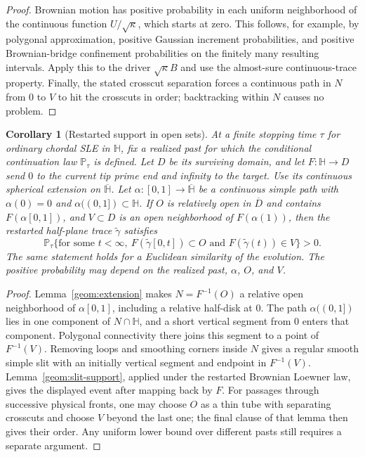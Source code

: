 \documentclass[11pt]{article}
\newtheorem{corollary}[theorem]{Corollary}
\theoremstyle{definition}
\theoremstyle{remark}
\numberwithin{equation}{section}
\begin{document}
\begin{proof}
Brownian motion has positive probability in each uniform
neighborhood of the continuous function $U/\sqrt\kappa$, which
starts at zero.  This follows, for example, by polygonal approximation,
positive Gaussian increment probabilities, and positive Brownian-bridge
confinement probabilities on the finitely many resulting intervals.
Apply this to the driver $\sqrt\kappa B$ and use the almost-sure
continuous-trace property.  Finally, the stated crosscut separation
forces a continuous path in $N$ from $0$ to $V$ to hit the crosscuts
in order; backtracking within $N$ causes no problem.
\end{proof}

\begin{corollary}[Restarted support in open sets]
\label{geom:restart-support}
At a finite stopping time $\tau$ for ordinary chordal SLE in
$\mathbb H$, fix a realized past for which the conditional continuation
law $\mathbb P_\tau$ is defined.  Let $D$ be its surviving domain, and
let $F:\mathbb H\to D$ send $0$ to the current tip prime end and infinity
to the target.  Use its continuous spherical extension on
$\overline{\mathbb H}$.  Let
$\alpha:[0,1]\to\overline{\mathbb H}$ be a continuous simple path with
$\alpha(0)=0$ and $\alpha((0,1])\subset\mathbb H$.
If $O$ is relatively open in $\overline D$ and contains
$F(\alpha[0,1])$, and $V\subset D$ is an open neighborhood of
$F(\alpha(1))$, then the restarted half-plane trace $\widetilde\gamma$
satisfies
\[
 \mathbb P_\tau\{\text{for some }t<\infty,
   \ F(\widetilde\gamma[0,t])\subset O
       \text{ and }F(\widetilde\gamma(t))\in V\}>0.
\]
The same statement holds for a Euclidean similarity of the evolution.
The positive probability may depend on the realized past, $\alpha$,
$O$, and $V$.
\end{corollary}

\begin{proof}
Lemma~\ref{geom:extension} makes $N=F^{-1}(O)$ a relative open
neighborhood of $\alpha[0,1]$, including a relative half-disk at $0$.
The path $\alpha((0,1])$ lies in one component of $N\cap\mathbb H$,
and a short vertical segment from $0$ enters that component.  Polygonal
connectivity there joins this segment to a point of $F^{-1}(V)$.
Removing loops and smoothing corners inside $N$ gives a regular smooth
simple slit with an initially vertical segment and endpoint in
$F^{-1}(V)$.
Lemma~\ref{geom:slit-support}, applied under the restarted Brownian
Loewner law, gives the displayed event after mapping back by $F$.
For passages through successive physical fronts, one may choose $O$
as a thin tube with separating crosscuts and choose $V$ beyond the
last one; the final clause of that lemma then gives their order.
Any uniform lower bound over different pasts still requires a
separate argument.
\end{proof}
\end{document}
